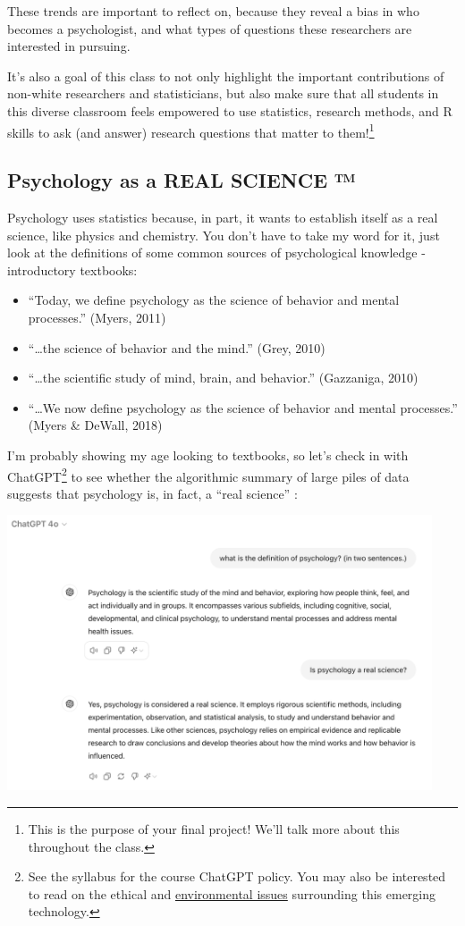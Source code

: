 \documentclass[
  letterpaper,
  DIV=11,
  numbers=noendperiod,
  oneside]{scrreprt}
\begin{document}
These trends are important to reflect on, because they reveal a bias in
who becomes a psychologist, and what types of questions these
researchers are interested in pursuing.

It's also a goal of this class to not only highlight the important
contributions of non-white researchers and statisticians, but also make
sure that all students in this diverse classroom feels empowered to use
statistics, research methods, and R skills to ask (and answer) research
questions that matter to them!\footnote{This is the purpose of your
  final project! We'll talk more about this throughout the class.}

\subsection{Psychology as a REAL SCIENCE
™}\label{psychology-as-a-real-science}

Psychology uses statistics because, in part, it wants to establish
itself as a real science, like physics and chemistry. You don't have to
take my word for it, just look at the definitions of some common sources
of psychological knowledge - introductory textbooks:

\begin{itemize}
\item
  ``Today, we define psychology as the science of behavior and mental
  processes.'' (Myers, 2011)
\item
  ``\ldots the science of behavior and the mind.'' (Grey, 2010)
\item
  ``\ldots the scientific study of mind, brain, and behavior.''
  (Gazzaniga, 2010)
\item
  ``\ldots We now define psychology as the science of behavior and
  mental processes.'' (Myers \& DeWall, 2018)
\end{itemize}

I'm probably showing my age looking to textbooks, so let's check in with
ChatGPT\footnote{See the syllabus for the course ChatGPT policy. You may
  also be interested to read on the ethical and
  \href{https://bsj.studentorg.berkeley.edu/the-new-dimension-to-the-climate-crisis-chat-gpt/}{environmental
  issues} surrounding this emerging technology.} to see whether the
algorithmic summary of large piles of data suggests that psychology is,
in fact, a ``real science'' :~

\includegraphics[width=4.94792in,height=\textheight,keepaspectratio]{images/1_psychsci_chatGPT_def.png}
\end{document}
